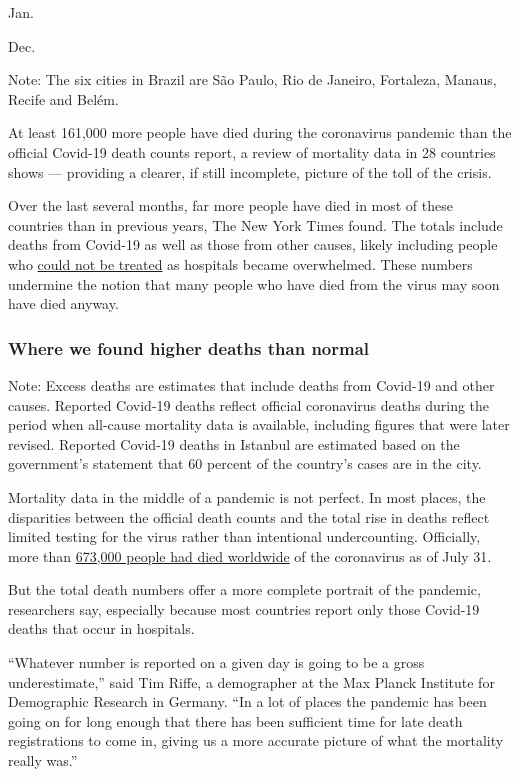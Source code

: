 Jan.

Dec.

Note: The six cities in Brazil are São Paulo, Rio de Janeiro, Fortaleza,
Manaus, Recife and Belém.

At least 161,000 more people have died during the coronavirus pandemic
than the official Covid-19 death counts report, a review of mortality
data in 28 countries shows --- providing a clearer, if still incomplete,
picture of the toll of the crisis.

Over the last several months, far more people have died in most of these
countries than in previous years, The New York Times found. The totals
include deaths from Covid-19 as well as those from other causes, likely
including people who
\href{https://www.nytimes3xbfgragh.onion/2020/04/20/health/treatment-delays-coronavirus.html}{could
not be treated} as hospitals became overwhelmed. These numbers undermine
the notion that many people who have died from the virus may soon have
died anyway.

\hypertarget{where-we-found-higher-deaths-than-normal}{%
\subsubsection{Where we found higher deaths than
normal}\label{where-we-found-higher-deaths-than-normal}}

Note: Excess deaths are estimates that include deaths from Covid-19 and
other causes. Reported Covid-19 deaths reflect official coronavirus
deaths during the period when all-cause mortality data is available,
including figures that were later revised. Reported Covid-19 deaths in
Istanbul are estimated based on the government's statement that 60
percent of the country's cases are in the city.

Mortality data in the middle of a pandemic is not perfect. In most
places, the disparities between the official death counts and the total
rise in deaths reflect limited testing for the virus rather than
intentional undercounting. Officially, more than
\href{https://www.nytimes3xbfgragh.onion/interactive/2020/world/coronavirus-maps.html}{673,000
people had died worldwide} of the coronavirus as of July 31.

But the total death numbers offer a more complete portrait of the
pandemic, researchers say, especially because most countries report only
those Covid-19 deaths that occur in hospitals.

``Whatever number is reported on a given day is going to be a gross
underestimate,'' said Tim Riffe, a demographer at the Max Planck
Institute for Demographic Research in Germany. ``In a lot of places the
pandemic has been going on for long enough that there has been
sufficient time for late death registrations to come in, giving us a
more accurate picture of what the mortality really was.''

